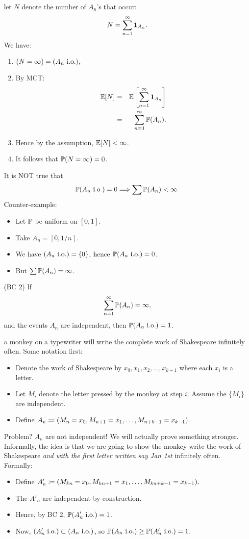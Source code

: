 \documentclass{article}
\begin{document}
 let $N$ denote the number of $A_n$'s that occur: \[ N = \sum_{n=1}^\infty \1_{A_n}. \]We have:
\begin{enumerate}
  \item $(N = \infty) = (A_n\io)$,
  \item By MCT: 
\begin{eqnarray*}
\E[N] &=& \E\left[\sum_{n=1}^\infty \1_{A_n}\right] \\
&=& \sum_{n=1}^\infty \P(A_n).
\end{eqnarray*} 
  \item Hence by the assumption, $\E[N] < \infty$.
  \item It follows that $\P(N = \infty) = 0$.
\end{enumerate}

 It is NOT true that \[ \P(A_n\io) = 0 \Longrightarrow \sum \P(A_n) < \infty. \] Counter-example:
\begin{itemize}
	\item Let $\P$ be uniform on $[0, 1]$.
  \item Take $A_n = [0, 1/n]$.
  \item We have $(A_n \io) = \{0\}$, hence $\P(A_n \io) = 0$.
  \item But $\sum \P(A_n) = \infty$.
\end{itemize}

 (BC 2) If \[ \sum_{n=1}^\infty \P(A_n) = \infty,\]and the events $A_n$ are independent, then $\P(A_n\io) = 1$.

 a monkey on a typewriter will write the complete work of Shakespeare infinitely often. Some notation first:
\begin{itemize}
  \item Denote the work of Shakespeare by $x_0, x_1, x_2, \dots, x_{k-1}$ where each $x_i$ is a letter.
  \item Let $M_i$ denote the letter pressed by the monkey at step $i$. Assume the $\{M_i\}$ are independent.
  \item Define $A_n \defeq (M_n = x_0, M_{n+1} = x_1, \dots, M_{n+k-1} = x_{k-1})$.
\end{itemize}
Problem? $A_n$ are not independent! We will actually prove something stronger. Informally, the idea is that we are going to show the monkey write the work of Shakespeare \emph{and with the first letter written say Jan 1st} infinitely often. Formally:
\begin{itemize}
  \item Define $A'_n \defeq (M_{kn} = x_0, M_{kn+1} = x_1, \dots, M_{kn+k-1} = x_{k-1}).$
  \item The $A'_n$ are independent by construction.
  \item Hence, by BC 2, $\P(A'_n \io) = 1$.
  \item Now, $(A'_n\io) \subset (A_n \io)$, so $\P(A_n \io) \ge \P(A'_n\io) = 1$.
\end{itemize} 
\end{document}

